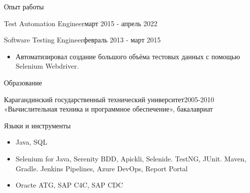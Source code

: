 \documentclass[]{cv}
\begin{document}
\begin{cvsection}{Опыт работы}
\begin{cvsubsection}{Test Automation Engineer}{}{март 2015 - апрель 2022}
\begin{itemize}
			\end{itemize}
		\end{cvsubsection}
		\begin{cvsubsection}{Software Testing Engineer}{}{февраль 2013 - март 2015}
			\begin{itemize}
				\item Автоматизировал создание большого объёма тестовых данных с помощью Selenium Webdriver.
			\end{itemize}
		\end{cvsubsection}
	\end{cvsection}
	\begin{cvsection}{Образование}
		\begin{cvsubsection}{Карагандинский государственный технический университет}{}{2005-2010}
		«Вычислительная техника и программное обеспечение», бакалавриат
		\end{cvsubsection}
	\end{cvsection}	
	\begin{cvsection}{Языки и инструменты}
		\begin{cvsubsection}{}{}{}	
			\begin{itemize}
				\item Java, SQL
				\item Selenium for Java, Serenity BDD, Apickli, Selenide. TestNG, JUnit. Maven, Gradle. Jenkins Pipelines, Azure DevOps, Report Portal
				\item Oracte ATG, SAP C4C, SAP CDC
			\end{itemize}
		\end{cvsubsection}
	\end{cvsection}
	
\end{document}
